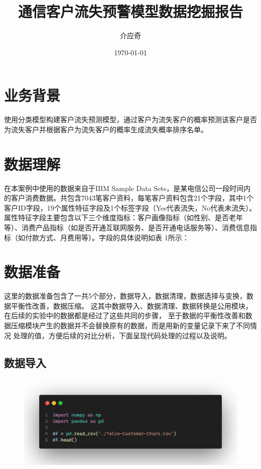 \documentclass{article}
\begin{document}
\title{通信客户流失预警模型数据挖掘报告}
\author{介应奇}
\date{\today}
\maketitle
\tableofcontents


\section{业务背景}
使用分类模型构建客户流失预测模型，通过客户为流失客户的概率预测该客户是否为流失客户并根据客户为流失客户的概率生成流失概率排序名单。

\section{数据理解}
在本案例中使用的数据来自于IBM Sample Data Sets，是某电信公司一段时间内的客户消费数据。共包含7043笔客户资料，每笔客户资料包含21个字段，其中1个客户ID字段，19个属性特征字段及1个标签字段（Yes代表流失，No代表未流失）。属性特征字段主要包含以下三个维度指标：客户画像指标（如性别、是否老年等）、消费产品指标（如是否开通互联网服务、是否开通电话服务等）、消费信息指标（如付款方式、月费用等）。字段的具体说明如表 1所示：

\section{数据准备}
这里的数据准备包含了一共5个部分，数据导入，数据清理，数据选择与变换，数据平衡性改善，数据压缩。
这其中数据导入、数据清理、数据转换是公用模块，在后续的实验中的数据都是经过了这些共同的步骤，
至于数据的平衡性改善和数据压缩模块产生的数据并不会替换原有的数据，而是用新的变量记录下来了不同情况
处理的值，方便后续的对比分析，下面呈现代码处理的过程以及说明。

\subsection{数据导入}
\begin{figure}[H]
	\centering
	\includegraphics[width=\textwidth]{./img/import_data.png}
\end{figure}
\end{document}
